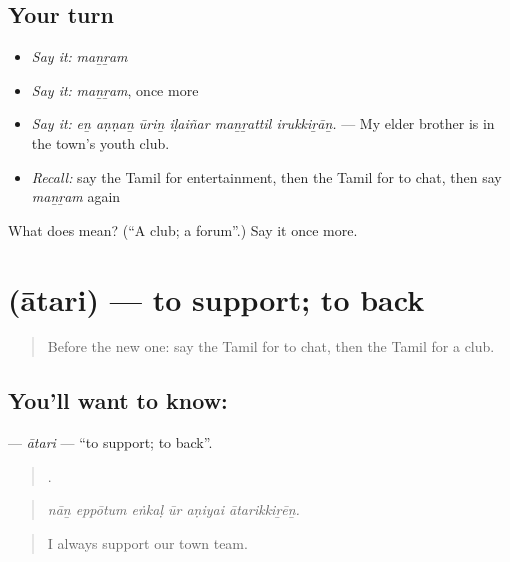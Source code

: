 \subsection*{Your turn}
\begin{itemize}
\raggedright
  \item \emph{Say it:} \emph{maṉṟam}
  \item \emph{Say it:} \emph{maṉṟam}, once more
  \item \emph{Say it:} \emph{eṉ aṇṇaṉ ūriṉ iḷaiñar maṉṟattil irukkiṟāṉ.} — My elder brother is in the town's youth club.
  \item \emph{Recall:} say the Tamil for entertainment, then the Tamil for to chat, then say \emph{maṉṟam} again
\end{itemize}

\begin{tcolorbox}[breakable,colback=teal!4,colframe=teal!35!black,title={Before you move on}]
What does  mean? (\textquotedblleft{}A club; a forum\textquotedblright{}.) Say it once more.
\end{tcolorbox}
\section[\texorpdfstring{\ta{ஆதரி} (ātari)}{ஆதரி (ātari)}]{ (ātari) — to support; to back}

\label{lesson:TA-C527-atari}



\begin{quote}
Before the new one: say the Tamil for to chat, then the Tamil for a club.
\end{quote}

\subsection*{You'll want to know: }
\textbf{} — \emph{ātari} — \textquotedblleft{}to support; to back\textquotedblright{}.

\begin{quote}
     .
\end{quote}

\begin{quote}
\emph{nāṉ eppōtum eṅkaḷ ūr aṇiyai ātarikkiṟēṉ.}
\end{quote}

\begin{quote}
I always support our town team.
\end{quote}

